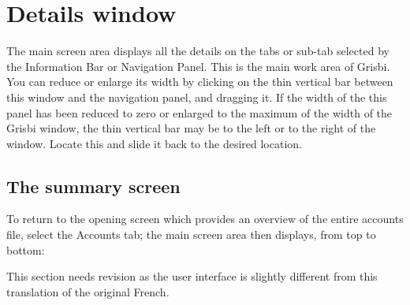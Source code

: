 

\section{Details window\label{home-details}}

The main screen area displays all the details on the tabs or sub-tab selected by the Information Bar or Navigation Panel. This is the main work area of Grisbi.
You can reduce or enlarge its width by clicking on the thin vertical bar between this window and the navigation panel, and dragging it. If the width of the this panel has been reduced to zero or enlarged to the maximum of the width of the Grisbi window, the thin vertical bar may be to the left or to the right of the window.  Locate this and slide it back to the desired location.
 
\subsection{The summary screen\label{home-details-homepage}}

To return to the opening screen which provides an overview of the entire accounts file, select the Accounts tab; the main screen area then displays, from top to bottom:

 This section needs revision as the user interface is slightly different from this translation of the original French.

